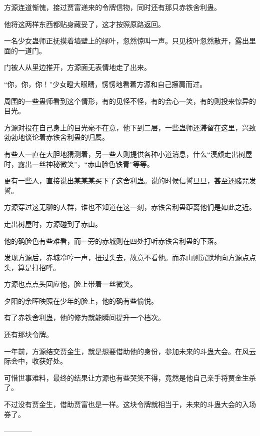 \begin{this_body}
方源连道惭愧，接过贾富递来的令牌信物，同时还有那只赤铁舍利蛊。

他将这两样东西都贴身藏妥了，这才按照原路返回。

一名少女蛊师正抚摸着墙壁上的绿叶，忽然惊叫一声。只见枝叶忽然散开，露出里面的一道门。

门被人从里边推开，方源面无表情地走了出来。

“你，你，你！”少女瞪大眼睛，愣愣地看着方源和自己擦肩而过。

周围的一些蛊师看到这个情形，有的见怪不怪，有的会心一笑，有的则投来惊异的目光。

方源对投在自己身上的目光毫不在意，他下到二层，一些蛊师还滞留在这里，兴致勃勃地谈论着赤铁舍利蛊的归属。

有些人一直在大胆地猜测着，另一些人则提供各种小道消息，什么“漠颜走出树屋时，露出一丝神秘微笑”，“赤山脸色铁青”等等。

更有一些人，直接说出某某某买下了这舍利蛊。说的时候信誓旦旦，甚至还赌咒发誓。

方源穿过这无聊的人群，谁也不知道在这一刻，赤铁舍利蛊距离他们是如此之近。

走出树屋时，方源碰到了赤山。

他的确脸色有些难看，而一旁的赤城则在四处打听赤铁舍利蛊的下落。

发现方源后，赤城冷哼一声，扭过头去，故意不看他。而赤山则沉默地向方源点点头，算是打招呼。

方源也点点头回应他，脸上带着一丝微笑。

夕阳的余晖映照在少年的脸上，他的确有些愉悦。

有了赤铁舍利蛊，他的修为就能瞬间提升一个档次。

还有那块令牌。

一年前，方源结交贾金生，就是想要借助他的身份，参加未来的斗蛊大会。在风云际会中，收获好处。

可惜世事难料，最终的结果让方源也有些哭笑不得，竟然是他自己亲手将贾金生杀了。

不过没有贾金生，借助贾富也是一样。这块令牌就相当于，未来的斗蛊大会的入场券了。

------------

\end{this_body}

